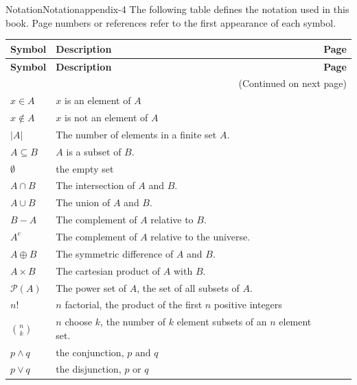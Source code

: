 \documentclass[twoside,10pt,]{book}
\numberwithin{equation}{section}
\begin{document}
\begin{appendixptx}{Notation}{}{Notation}{}{}{appendix-4}
\hypertarget{p-6218}{}%
The following table defines the notation used in this book. Page numbers or references refer to the first appearance of each symbol.%
\begin{longtable}[l]{lp{}r}
\addtocounter{table}{-1}
\textbf{Symbol}&\textbf{Description}&\textbf{Page}\\[1em]
\endfirsthead
\textbf{Symbol}&\textbf{Description}&\textbf{Page}\\[1em]
\endhead
\multicolumn{3}{r}{(Continued on next page)}\\
\endfoot
\endlastfoot
\(x \in A\)&\(x\) is an element of \(A\)&\pageref{notation-1}\\
\(x \notin A\)&\(x\) is not an element of \(A\)&\pageref{notation-2}\\
\(\lvert A \rvert \)&The number of elements in a finite set \(A\).&\pageref{notation-3}\\
\(A \subseteq B\)&\(A\) is a subset of \(B\).&\pageref{notation-4}\\
\(\emptyset\)&the empty set&\pageref{notation-5}\\
\(A \cap  B\)&The intersection of \(A\) and \(B\).&\pageref{notation-6}\\
\(A \cup  B\)&The union of \(A\) and \(B\).&\pageref{notation-7}\\
\(B - A\)&The complement of \(A\) relative to \(B\).&\pageref{notation-8}\\
\(A^c\)&The complement of \(A\) relative to the universe.&\pageref{notation-9}\\
\(A\oplus B\)&The symmetric difference of \(A\) and \(B\).&\pageref{notation-10}\\
\(A \times B\)&The cartesian product of \(A\) with \(B\).&\pageref{notation-11}\\
\(\mathcal{P}(A)\)&The power set of \(A\), the set of all subsets of \(A\).&\pageref{notation-12}\\
\(n!\)&\(n\) factorial, the product of the first \(n\) positive integers&\pageref{notation-13}\\
\(\binom{n}{k}\)&\(n\) choose \(k\), the number of \(k\) element subsets of an \(n\) element set.&\pageref{notation-14}\\
\(p \land q\)&the conjunction, \(p \textrm{ and } q\)&\pageref{notation-15}\\
\( p \lor q\)&the disjunction, \(p \textrm{ or } q\)&\pageref{notation-16}\\

\end{longtable}
\end{appendixptx}
\end{document}
